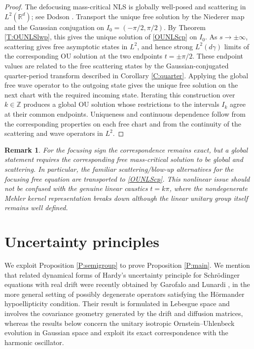 \documentclass[11pt,a4paper]{amsart}
\newcommand{\Rm}{\mathbb R^d}
\numberwithin{equation}{section}
\newtheorem{remark}[theorem]{Remark}
\numberwithin{equation}{section}
\begin{document}
\begin{proof}
The defocusing mass-critical NLS is globally well-posed and scattering
in $L^2(\Rm)$; see Dodson \cite{Do1,Do2,Do3}. Transport the unique
free solution by the Niederer map and the Gaussian conjugation on
$I_0=(-\pi/2,\pi/2)$. By Theorem \ref{T:OUNLSlwp}, this gives the
unique solution of \eqref{OUNLScp} on $I_0$. As $s\to\pm\infty$,
scattering gives free asymptotic states in $L^2$, and hence strong
$L^2(d\gamma)$ limits of the corresponding OU solution at the two
endpoints $t=\pm\pi/2$. These endpoint values are related to the
free scattering states by the Gaussian-conjugated quarter-period
transform described in Corollary \ref{C:quarter}. Applying the global
free wave operator to the outgoing state gives the unique free
solution on the next chart with the required incoming state.
Iterating this construction over $k\in\mathbb Z$ produces a global
OU solution whose restrictions to the intervals $I_k$ agree at their
common endpoints. Uniqueness and continuous dependence follow from
the corresponding properties on each free chart and from the
continuity of the scattering and wave operators in $L^2$.
\end{proof}

\begin{remark}\label{R:focusing}
For the focusing sign the correspondence remains exact, but a global statement requires the corresponding free mass-critical solution to be global and scattering.  In particular, the familiar scattering/blow-up alternatives for the focusing free equation are transported to \eqref{OUNLScp}.  This nonlinear issue should not be confused with the genuine linear caustics $t=k\pi$, where the nondegenerate Mehler kernel representation breaks down although the linear unitary group itself remains well defined.
\end{remark}

\section{Uncertainty principles}\label{S:uncertainty}

We exploit Proposition \ref{P:semigroup} to prove Proposition \ref{P:main}. We mention that related dynamical forms of Hardy's uncertainty principle for
Schr\"odinger equations with real drift were recently obtained by
Garofalo and Lunardi \cite{GarLun}, in the more general setting of
possibly degenerate operators satisfying the H\"ormander
hypoellipticity condition. Their result is formulated in Lebesgue space and involves the
covariance geometry generated by the drift and diffusion matrices,
whereas the results below concern the unitary isotropic
Ornstein--Uhlenbeck evolution in Gaussian space and exploit its
exact correspondence with the harmonic oscillator.
\end{document}
